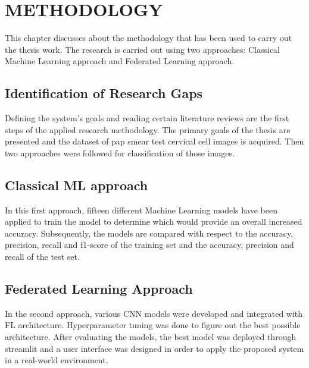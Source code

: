 \chapter{METHODOLOGY}\label{METHODOLOGY}

This chapter discusses about the methodology that has been used to carry out the thesis work. The research is carried out using two approaches: Classical Machine Learning approach and Federated Learning approach.

\section{Identification of Research Gaps} 
Defining the system's goals and reading certain literature reviews are the first steps of the applied research methodology. The primary goals of the thesis are presented and the dataset of pap smear test cervical cell images is acquired. Then two approaches were followed for classification of those images.  

\section{Classical ML approach}
In this first approach, fifteen different Machine Learning models have been applied to train the model to determine which would provide an overall increased accuracy. Subsequently, the models are compared with respect to the accuracy, precision, recall and f1-score of the training set and the accuracy, precision and recall of the test set.

\section{Federated Learning Approach}
In the second approach, various CNN models were developed and integrated with FL architecture. Hyperparameter tuning was done to figure out the best possible architecture. After evaluating the models, the best model was deployed through streamlit and a user interface was designed in order to apply the proposed system in a real-world environment. 

